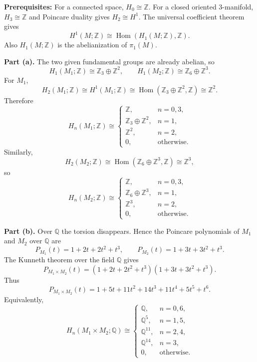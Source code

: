 \begin{solution}
\textbf{Prerequisites:}
For a connected space, $H_0\cong\mathbb{Z}$. For a closed oriented 3-manifold,
$H_3\cong\mathbb{Z}$ and Poincare duality gives $H_2\cong H^1$. The universal
coefficient theorem gives
\[
    H^1(M;\mathbb{Z})\cong\operatorname{Hom}(H_1(M;\mathbb{Z}),\mathbb{Z}).
\]
Also $H_1(M;\mathbb{Z})$ is the abelianization of $\pi_1(M)$.

\textbf{Part (a).}
The two given fundamental groups are already abelian, so
\[
    H_1(M_1;\mathbb{Z})\cong \mathbb{Z}_3\oplus\mathbb{Z}^2,
    \qquad
    H_1(M_2;\mathbb{Z})\cong \mathbb{Z}_6\oplus\mathbb{Z}^3.
\]
For $M_1$,
\[
    H_2(M_1;\mathbb{Z})
    \cong
    H^1(M_1;\mathbb{Z})
    \cong
    \operatorname{Hom}(\mathbb{Z}_3\oplus\mathbb{Z}^2,\mathbb{Z})
    \cong
    \mathbb{Z}^2.
\]
Therefore
\[
    H_n(M_1;\mathbb{Z})\cong
    \begin{cases}
        \mathbb{Z}, & n=0,3,\\
        \mathbb{Z}_3\oplus\mathbb{Z}^2, & n=1,\\
        \mathbb{Z}^2, & n=2,\\
        0, & \text{otherwise}.
    \end{cases}
\]
Similarly,
\[
    H_2(M_2;\mathbb{Z})
    \cong
    \operatorname{Hom}(\mathbb{Z}_6\oplus\mathbb{Z}^3,\mathbb{Z})
    \cong
    \mathbb{Z}^3,
\]
so
\[
    H_n(M_2;\mathbb{Z})\cong
    \begin{cases}
        \mathbb{Z}, & n=0,3,\\
        \mathbb{Z}_6\oplus\mathbb{Z}^3, & n=1,\\
        \mathbb{Z}^3, & n=2,\\
        0, & \text{otherwise}.
    \end{cases}
\]

\textbf{Part (b).}
Over $\mathbb{Q}$ the torsion disappears. Hence the Poincare polynomials of
$M_1$ and $M_2$ over $\mathbb{Q}$ are
\[
    P_{M_1}(t)=1+2t+2t^2+t^3,
    \qquad
    P_{M_2}(t)=1+3t+3t^2+t^3.
\]
The Kunneth theorem over the field $\mathbb{Q}$ gives
\[
    P_{M_1\times M_2}(t)
    =
    (1+2t+2t^2+t^3)(1+3t+3t^2+t^3).
\]
Thus
\[
    P_{M_1\times M_2}(t)
    =
    1+5t+11t^2+14t^3+11t^4+5t^5+t^6.
\]
Equivalently,
\[
    H_n(M_1\times M_2;\mathbb{Q})\cong
    \begin{cases}
        \mathbb{Q}, & n=0,6,\\
        \mathbb{Q}^5, & n=1,5,\\
        \mathbb{Q}^{11}, & n=2,4,\\
        \mathbb{Q}^{14}, & n=3,\\
        0, & \text{otherwise}.
    \end{cases}
\]


\end{solution}
